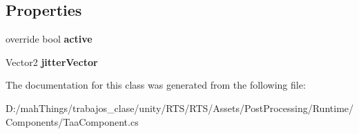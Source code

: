 \subsection*{Properties}
\begin{DoxyCompactItemize}
\item 
\mbox{\label{class_unity_engine_1_1_post_processing_1_1_taa_component_aadb855573680151dae4900d12af520b2}} 
override bool {\bfseries active}
\item 
\mbox{\label{class_unity_engine_1_1_post_processing_1_1_taa_component_ad7a44ec209bac50e7f42e10784462019}} 
Vector2 {\bfseries jitter\+Vector}
\end{DoxyCompactItemize}


The documentation for this class was generated from the following file\+:\begin{DoxyCompactItemize}
\item 
D\+:/mah\+Things/trabajos\+\_\+clase/unity/\+R\+T\+S/\+R\+T\+S/\+Assets/\+Post\+Processing/\+Runtime/\+Components/Taa\+Component.\+cs\end{DoxyCompactItemize}
